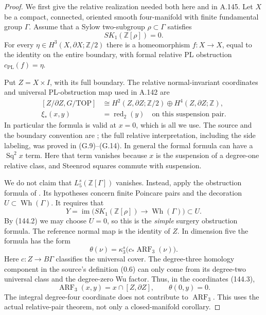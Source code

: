\begin{proof}
We first give the relative realization needed both here and in A.145.
Let $X$ be a compact, connected, oriented smooth four-manifold with
finite fundamental group $\Gamma$. Assume that a Sylow two-subgroup
$\rho\subset\Gamma$ satisfies
\[
                 SK_1(\mathbb Z[\rho])=0.
 \tag{144.2}
\]
For every $\eta\in H^3(X,\partial X;\mathbb Z/2)$ there is a
homeomorphism $f:X\to X$, equal to the identity on the entire boundary,
with formal relative PL obstruction $c_{\mathrm{PL}}(f)=\eta$.

Put $Z=X\times I$, with its full boundary. The relative normal-invariant
coordinates and universal PL-obstruction map used in A.142 are
\[
 \begin{aligned}
 [Z/\partial Z,G/\mathrm{TOP}]
   &\cong H^2(Z,\partial Z;\mathbb Z/2)
                  \oplus H^4(Z,\partial Z;\mathbb Z),\\
 \xi_*(x,y)&=\operatorname{red}_2(y)
             \quad\text{on this suspension pair}.
 \end{aligned}
 \tag{144.3}
\]
In particular the formula is valid at $x=0$, which is all we use.
The source and the boundary convention are
\cite[Lemmas 4.8--4.9, printed p.~2526]{Galvin2026};
the full relative interpretation, including the side labeling, was
proved in (G.9)--(G.14). In general the formal formula can have a
$\operatorname{Sq}^2x$ term. Here that term vanishes because $x$
is the suspension of a degree-one relative class, and Steenrod
squares commute with suspension.

We do not claim that $L^s_5(\mathbb Z[\Gamma])$ vanishes. Instead,
apply the obstruction formula of
\cite[Theorem A(b), printed p.~351]{HambletonMilgramTaylorWilliams1988}.
Its hypotheses concern finite Poincare pairs and the decoration
$U\subset\operatorname{Wh}(\Gamma)$. It requires that
\[
 Y=\operatorname{im}\bigl(SK_1(\mathbb Z[\rho])
                   \longrightarrow\operatorname{Wh}(\Gamma)\bigr)
                         \subset U.
\]
By (144.2) we may choose $U=0$, so this is the \emph{simple} surgery
obstruction formula. The reference normal map is the identity of $Z$.
In dimension five the formula has the form
\[
       \theta(\nu)=\kappa_3^s\bigl(c_*
                   \operatorname{ARF}_3(\nu)\bigr).
 \tag{144.4}
\]
Here $c:Z\to B\Gamma$ classifies the universal cover. The degree-three
homology component in the source's definition (0.6) can only come
from its degree-two universal class and the degree-zero Wu factor.
Thus, in the coordinates (144.3),
\[
       \operatorname{ARF}_3(x,y)
              =x\mathbin{\cap}[Z,\partial Z],
       \qquad \theta(0,y)=0.
 \tag{144.5}
\]
The integral degree-four coordinate does not contribute to
$\operatorname{ARF}_3$. This uses the actual relative-pair theorem,
not only a closed-manifold corollary.


\end{proof}
